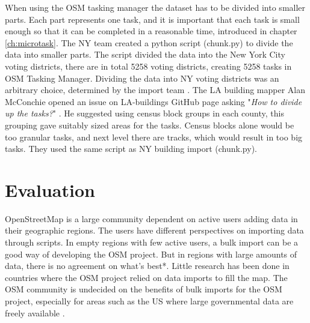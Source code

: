 When using the OSM tasking manager the dataset has to be divided into smaller parts. Each part represents one task, and it is important that each task is small enough so that it can be completed in a reasonable time, introduced in chapter \ref{ch:microtask}. The NY team created a python script (chunk.py) to divide the data into smaller parts. The script divided the data into the New York City voting districts, there are in total 5258 voting districts, creating 5258 tasks in OSM Tasking Manager. Dividing the data into NY voting districts was an arbitrary choice, determined by the import team \cite{Barth2014}. The LA building mapper Alan McConchie opened an issue on LA-buildings GitHub page asking "\textit{How to divide up the tasks?}" \cite{McConchie2014}. He suggested using census block groups in each county, this grouping gave suitably sized areas for the tasks. Census blocks alone would be too granular tasks, and next level there are tracks, which would result in too big tasks. They used the same script as NY building import (chunk.py). 



\section{Evaluation}
OpenStreetMap is a large community dependent on active users adding data in their geographic regions. The users have different perspectives on importing data through scripts. In empty regions with few active users, a bulk import can be a good way of developing the OSM project. But in regions with large amounts of data, there is no agreement on what's best*. Little research has been done in countries where the OSM project relied on data imports to fill the map. The OSM community is undecided on the benefits of bulk imports for the OSM project, especially for areas such as the US where large governmental data are freely available \cite{Zielstra2013}.


